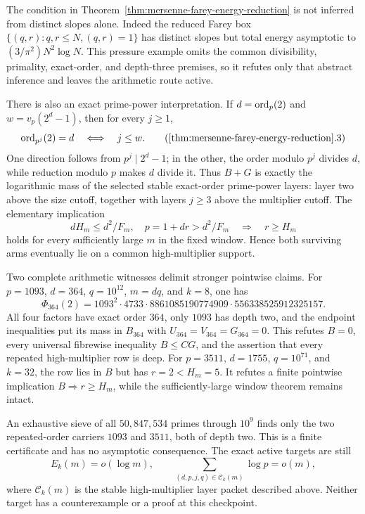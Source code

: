 The condition in
Theorem~\ref{thm:mersenne-farey-energy-reduction} is not inferred from
distinct slopes alone.  Indeed the reduced Farey box
$\{(q,r):q,r\le N,(q,r)=1\}$ has distinct slopes but total energy
asymptotic to $(3/\pi^2)N^2\log N$.  This pressure example omits the common
divisibility, primality, exact-order, and depth-three premises, so it refutes
only that abstract inference and leaves the arithmetic route active.

There is also an exact prime-power interpretation.  If
$d=\operatorname{ord}_p(2)$ and $w=v_p(2^d-1)$, then for every $j\ge1$,
\[
             \ord_{p^j}(2)=d\quad\Longleftrightarrow\quad j\le w.
 \tag{\ref{thm:mersenne-farey-energy-reduction}.3}
\]
One direction follows from $p^j\mid2^d-1$; in the other, the order modulo
$p^j$ divides $d$, while reduction modulo $p$ makes $d$ divide it.  Thus
$B+G$ is exactly the logarithmic mass of the selected stable exact-order
prime-power layers: layer two above the size cutoff, together with layers
$j\ge3$ above the multiplier cutoff.  The elementary implication
\[
 dH_m\le d^2/F_m,\quad p=1+dr>d^2/F_m
 \quad\Longrightarrow\quad r\ge H_m
\]
holds for every sufficiently large $m$ in the fixed window.  Hence both
surviving arms eventually lie on a common high-multiplier support.

Two complete arithmetic witnesses delimit stronger pointwise claims.  For
$p=1093$, $d=364$, $q=10^{12}$, $m=dq$, and $k=8$, one has
\[
 \Phi_{364}(2)=1093^2\cdot4733\cdot8861085190774909
 \cdot556338525912325157.
\]
All four factors have exact order $364$, only $1093$ has depth two, and the
endpoint inequalities put its mass in $B_{364}$ with
$U_{364}=V_{364}=G_{364}=0$.  This refutes $B=0$, every universal
fibrewise inequality $B\le CG$, and the assertion that every repeated
high-multiplier row is deep.  For $p=3511$, $d=1755$, $q=10^{71}$, and
$k=32$, the row lies in $B$ but has $r=2<H_m=5$.  It refutes a finite
pointwise implication $B\Rightarrow r\ge H_m$, while the sufficiently-large
window theorem remains intact.

An exhaustive sieve of all $50{,}847{,}534$ primes through $10^9$ finds
only the two repeated-order carriers $1093$ and $3511$, both of depth two.
This is a finite certificate and has no asymptotic consequence.  The exact
active targets are still
\[
 E_k(m)=o(\log m),
 \qquad
 \sum_{(d,p,j,q)\in\mathcal C_k(m)}\log p=o(m),
\]
where $\mathcal C_k(m)$ is the stable high-multiplier layer packet described
above.  Neither target has a counterexample or a proof at this checkpoint.
